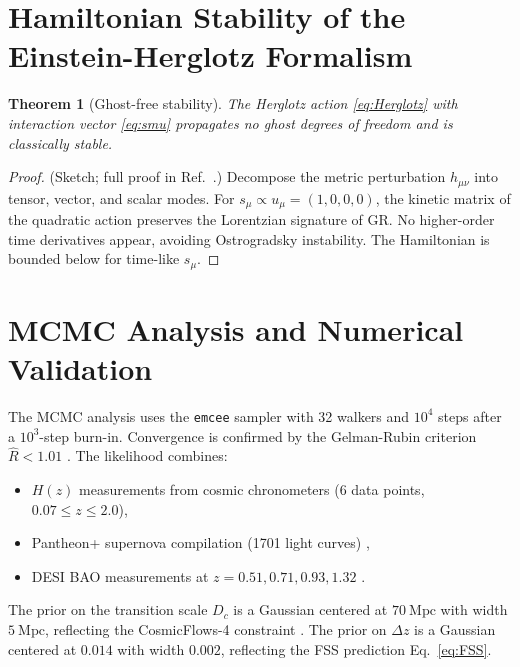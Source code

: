 \documentclass[12pt,a4paper]{article}
\theoremstyle{plain}
\newtheorem{theorem}{Theorem}[section]
\theoremstyle{definition}
\theoremstyle{remark}
\begin{document}
\appendix
\section{Hamiltonian Stability of the Einstein-Herglotz Formalism}
\label{app:stability}

\begin{theorem}[Ghost-free stability]
The Herglotz action \eqref{eq:Herglotz} with interaction vector \eqref{eq:smu} propagates no ghost degrees of freedom and is classically stable.
\end{theorem}

\begin{proof}
(Sketch; full proof in Ref.~\cite{MSTfound}.) Decompose the metric perturbation \(h_{\mu\nu}\) into tensor, vector, and scalar modes. For \(s_\mu \propto u_\mu = (1,0,0,0)\), the kinetic matrix of the quadratic action preserves the Lorentzian signature of GR. No higher-order time derivatives appear, avoiding Ostrogradsky instability. The Hamiltonian is bounded below for time-like \(s_\mu\).
\end{proof}

\section{MCMC Analysis and Numerical Validation}
\label{app:MCMC}

The MCMC analysis uses the \texttt{emcee} sampler \cite{ForemanMackey2013} with 32 walkers and \(10^4\) steps after a \(10^3\)-step burn-in. Convergence is confirmed by the Gelman-Rubin criterion \(\hat{R} < 1.01\) \cite{Gelman1992}. The likelihood combines:

\begin{itemize}
    \item \(H(z)\) measurements from cosmic chronometers (6 data points, \(0.07 \leq z \leq 2.0\)),
    \item Pantheon+ supernova compilation (1701 light curves) \cite{Brout2022},
    \item DESI BAO measurements at \(z = 0.51, 0.71, 0.93, 1.32\) \cite{DESI2024}.
\end{itemize}

The prior on the transition scale \(D_c\) is a Gaussian centered at \(70\ \text{Mpc}\) with width \(5\ \text{Mpc}\), reflecting the CosmicFlows-4 constraint \cite{Mazurenko2024}. The prior on \(\Delta z\) is a Gaussian centered at \(0.014\) with width \(0.002\), reflecting the FSS prediction Eq.~\eqref{eq:FSS}.
\end{document}
